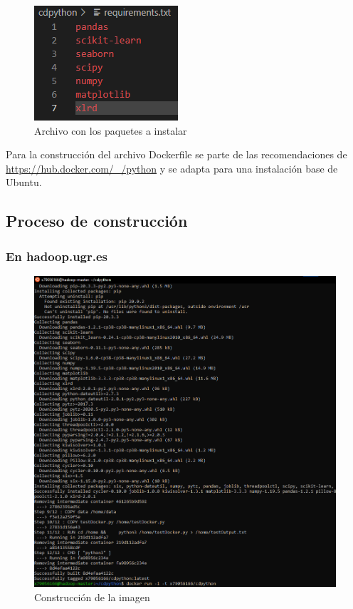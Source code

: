 \begin{figure}[H]\center\includegraphics[width=.65\linewidth]{img/python/p0-2.png}\caption{Archivo con los paquetes a instalar}\end{figure}

Para la construcción del archivo Dockerfile se parte de las recomendaciones de \url{https://hub.docker.com/_/python} y se adapta para una instalación base de Ubuntu.

\subsection{Proceso de construcción}

\subsubsection{En hadoop.ugr.es}

\begin{figure}[H]\center\includegraphics[width=.95\linewidth]{img/python/p1.png}\caption{Construcción de la imagen}\end{figure}

